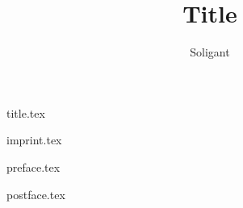\documentclass[draft,twoside]{book}
\title{Title}
\author{Soligant}
\begin{document}
    \frontmatter

    {title.tex}

    {imprint.tex}

    {preface.tex}
    \mainmatter

    \setcounter{chapter}{0}

    \backmatter
    {postface.tex}

\end{document}
